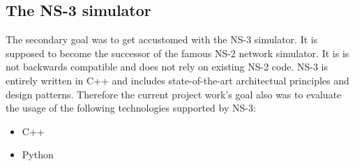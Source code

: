 \subsection{The NS-3 simulator}

The secondary goal was to get accustomed with the NS-3 simulator.
It is supposed to become the successor of the famous NS-2 network
simulator. It is is not backwards compatible and does not rely on
existing NS-2 code. NS-3 is entirely written in C++ and includes state-of-the-art
architectual principles and design patterns. Therefore the current
project work's goal also was to evaluate the usage of the following
technologies supported by NS-3:
\begin{itemize}
\item C++
\item Python
\end{itemize}

